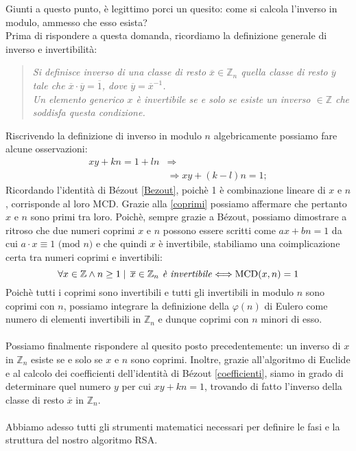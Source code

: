 \documentclass[a4paper,12pt]{article}
\begin{document}
Giunti a questo punto, è legittimo porci un quesito: come si calcola l'inverso in modulo, ammesso che esso esista?\\
Prima di rispondere a questa domanda, ricordiamo la definizione generale di inverso e invertibilità:
\begin{quote}
    \emph{Si definisce inverso di una classe di resto $\overline{x} \in \mathbb{Z}_n$ quella classe di resto $\overline{y}$ tale che $\overline{x} \cdot \overline{y} = \overline{1}$, dove $\overline{y}=\overline{x}^{-1}$.\\
    Un elemento generico $x$ è invertibile se e solo se esiste un inverso $\in \mathbb{Z}$ che soddisfa questa condizione.}
\end{quote}
Riscrivendo la definizione di inverso in modulo $n$ algebricamente possiamo fare alcune osservazioni:
\begin{equation}
\begin{split}
xy+kn=1+ln & \Longrightarrow\\
& \Longrightarrow xy + (k-l)n = 1;
\end{split}
\end{equation}
Ricordando l'identità di B\'ezout \eqref{Bezout}, poichè 1 è combinazione lineare di $x$ e $n$, corrisponde al loro MCD. Grazie alla \eqref{coprimi} possiamo affermare che pertanto $x$ e $n$ sono primi tra loro. Poichè, sempre grazie a B\'ezout, possiamo dimostrare a ritroso che due numeri coprimi $x$ e $n$ possono essere scritti come $ax+bn=1$ da cui $a \cdot x \equiv 1 \text{ (mod $n$)}$ e che quindi $x$ è invertibile, stabiliamo una coimplicazione certa tra numeri coprimi e invertibili:
\begin{equation}\label{CoprimiInvertibili}
\forall x \in \mathbb{Z} \land n \geq 1 \mid \, \overline{x} \in \mathbb{Z}_n \text{\emph{ è invertibile}} \Longleftrightarrow \text{MCD}(x,n)=1
\end{equation}
Poichè tutti i coprimi sono invertibili e tutti gli invertibili in modulo $n$ sono coprimi con $n$, possiamo integrare la definizione della $\varphi(n)$ di Eulero come numero di elementi invertibili in $\mathbb{Z}_n$ e dunque coprimi con $n$ minori di esso.\\\\
Possiamo finalmente rispondere al quesito posto precedentemente: un inverso di $x$ in $\mathbb{Z}_n$ esiste se e solo se $x$ e $n$ sono coprimi. Inoltre, grazie all'algoritmo di Euclide e al calcolo dei coefficienti dell'identità di B\'ezout \eqref{coefficienti}, siamo in grado di determinare quel numero $y$ per cui $xy+kn=1$, trovando di fatto l'inverso della classe di resto $\overline{x}$ in $\mathbb{Z}_n$.\\\\
Abbiamo adesso tutti gli strumenti matematici necessari per definire le fasi e la struttura del nostro algoritmo RSA.
\end{document}
